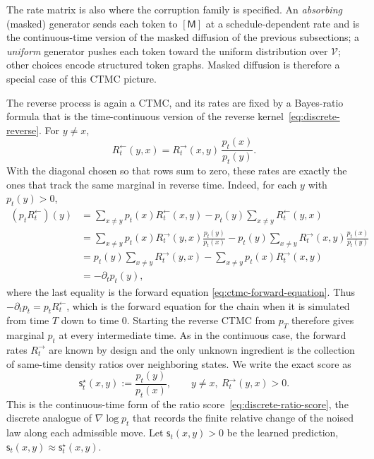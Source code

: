 \documentclass[10pt,a4paper]{amsart}
\numberwithin{equation}{section}
\newcommand{\mc}[1]{\mathcal{#1}}
\newcommand{\sstar}{\mathsf{s}^{\star}}
\newcommand{\score}{\mathsf{s}}
\begin{document}
The rate matrix is also where the corruption family is specified.  An
\emph{absorbing} (masked) generator sends each token to $[\mathsf M]$ at a
schedule-dependent rate and is the continuous-time version of the masked
diffusion of the previous subsections; a \emph{uniform} generator pushes each
token toward the uniform distribution over $\mc{V}$; other choices encode
structured token graphs.  Masked diffusion is therefore a special case of this CTMC picture.

The reverse process is again a CTMC, and its rates are fixed by a Bayes-ratio
formula that is the time-continuous version of the reverse
kernel~\eqref{eq:discrete-reverse}.  For $y\neq x$,
\begin{equation}\label{eq:ctmc-reverse-rate}
    R_t^{\leftarrow}(y,x)
    =
    R_t^{\to}(x,y)\,\frac{p_t(x)}{p_t(y)}.
\end{equation}
With the diagonal chosen so that rows sum to zero, these rates are exactly the
ones that track the same marginal in reverse time.  Indeed, for each
$y$ with $p_t(y)>0$,
\[
\begin{aligned}
    (p_tR_t^{\leftarrow})(y)
    &=
    \sum_{x\neq y}p_t(x)R_t^{\leftarrow}(x,y)
    -
    p_t(y)\sum_{x\neq y}R_t^{\leftarrow}(y,x)  \\
    &=
    \sum_{x\neq y}p_t(x)R_t^{\to}(y,x)\frac{p_t(y)}{p_t(x)}
    -
    p_t(y)\sum_{x\neq y}R_t^{\to}(x,y)\frac{p_t(x)}{p_t(y)}  \\
    &=
    p_t(y)\sum_{x\neq y}R_t^{\to}(y,x)
    -
    \sum_{x\neq y}p_t(x)R_t^{\to}(x,y)  \\
    &=
    -\partial_t p_t(y),
\end{aligned}
\]
where the last equality is the forward equation
\eqref{eq:ctmc-forward-equation}.  Thus
$-\partial_t p_t=p_tR_t^{\leftarrow}$, which is the forward equation for the
chain when it is simulated from time $T$ down to time $0$.  Starting the reverse
CTMC from $p_T$ therefore gives marginal $p_t$ at every intermediate time.
As in the continuous case, the forward rates $R_t^{\to}$ are known by design and
the only unknown ingredient is the collection of same-time density ratios over
neighboring states.  We write the exact score as
\[
    \sstar_t(x,y):=\frac{p_t(y)}{p_t(x)},
    \qquad y\neq x,\ R_t^{\to}(y,x)>0.
\]
This is the continuous-time form of the ratio
score~\eqref{eq:discrete-ratio-score}, the discrete analogue of
$\nabla\log p_t$ that records the finite relative change of the noised law along
each admissible move.  Let $\score_t(x,y)>0$ be the learned prediction,
$\score_t(x,y)\approx\sstar_t(x,y)$.
\end{document}
